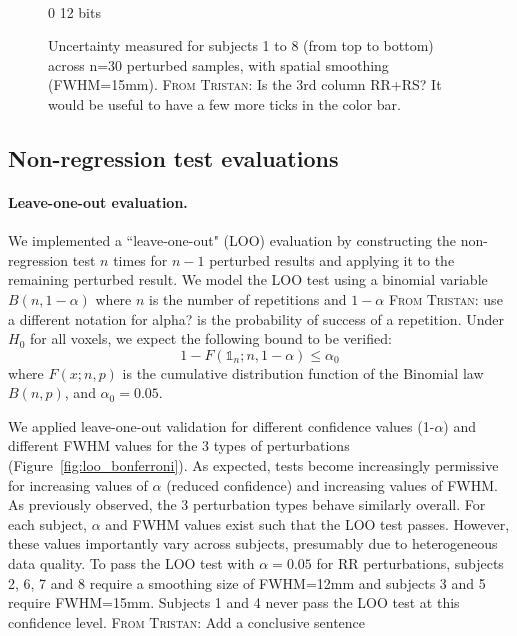 \documentclass{article}
\newcommand{\TG}[1]{\color{blue}\textsc{From Tristan:} #1\color{black}\xspace}
\begin{document}
\begin{landscape}
\begin{figure}
\begin{subfigure}[t]{0.2\paperheight}
        \end{subfigure} \\
        \hspace*{6cm} 0  12 bits
        \caption{Uncertainty measured for subjects 1 to 8 (from top to bottom) across n=30 perturbed samples, with spatial smoothing (FWHM=15mm). \TG{Is the 3rd column RR+RS? It would be useful to have a few more ticks in the color bar.}}
        \label{fig:uncertainty-maps}

    \end{figure}
\end{landscape}

\subsection{Non-regression test evaluations}

\paragraph{Leave-one-out evaluation.} We implemented a ``leave-one-out" (LOO) evaluation by constructing the non-regression test $n$ times for $n-1$ perturbed results and applying it to the remaining perturbed result. 
We model the LOO test using a binomial variable $B(n,1-\alpha)$ where $n$ is the number of repetitions and $1-\alpha$ \TG{use a different notation for alpha?} is the probability of success of a repetition. Under $H_0$ for all voxels, we expect the following bound to be verified:
\[
    1-F(\mathds{1}_n;n,1-\alpha) \leq \alpha_0
\]
where $F(x;n,p)$ is the cumulative distribution function of the Binomial law $B(n,p)$, and $\alpha_0=0.05$.

We applied leave-one-out validation for different confidence values (1-$\alpha$) and different FWHM  values for the 3 types of perturbations (Figure~\ref{fig:loo_bonferroni}). As expected, tests become increasingly permissive for increasing values of $\alpha$ (reduced confidence) and increasing values of FWHM.
As previously observed, the 3 perturbation types behave similarly overall. For each subject, $\alpha$ and FWHM values exist such that the LOO test passes. However, these values importantly vary across subjects, presumably due to heterogeneous data quality. To pass the LOO test with $\alpha=0.05$ for RR perturbations, subjects 2, 6, 7 and 8 require a smoothing size of FWHM=12mm and subjects 3 and 5 require FWHM=15mm. Subjects 1 and 4 never pass the LOO test at this confidence level.
\TG{Add a conclusive sentence}
\end{document}
